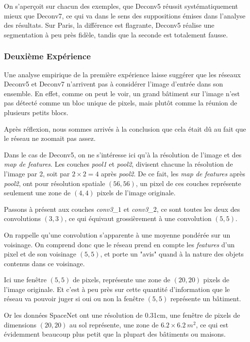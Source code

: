 \documentclass[a4paper, 11pt]{report}
\begin{document}
On s'aperçoit sur chacun des exemples, que Deconv5 réussit systématiquement mieux que Deconv7, ce qui va dans le sens des suppositions émises dans l'analyse des résultats.
Sur Paris, la différence est flagrante, Deconv5 réalise une segmentation à peu près fidèle, tandis que la seconde est totalement fausse.

\subsubsection{Deuxième Expérience}
Une analyse empirique de la première expérience laisse suggérer que les réseaux Deconv5 et Deconv7 n'arrivent pas à considérer l'image d'entrée dans son ensemble.
En effet, comme on peut le voir, un grand bâtiment sur l'image n'est pas détecté comme un bloc unique de pixels, mais plutôt comme la réunion de plusieurs petits blocs.

Après réflexion, nous sommes arrivés à la conclusion que cela était dû au fait que le réseau ne zoomait pas assez.

Dans le cas de Deconv5, on ne s'intéresse ici qu'à la résolution de l'image et des \emph{map de features}.
Les couches \emph{pool1} et \emph{pool2}, divisent chacune la résolution de l'image par 2, soit par $2 \times 2 = 4$ après \emph{pool2}.
De ce fait, les \emph{map de features} après \emph{pool2}, ont pour résolution spatiale $(56, 56)$, un pixel de ces couches représente seulement une zone de $(4, 4)$ pixels de l'image originale.

Passons à présent aux couches \emph{conv3\_$1$} et \emph{conv3\_$2$}, ce sont toutes les deux des convolutions $(3, 3)$, ce qui équivaut grossièrement à une convolution $(5, 5)$.

On rappelle qu'une convolution s'apparente à une moyenne pondérée sur un voisinage. On comprend donc que le réseau prend en compte les \emph{features} d'un pixel et de son voisinage $(5, 5)$, et porte un "avis" quand à la nature des objets contenus dans ce voisinage.

Ici une fenêtre $(5, 5)$ de pixels, représente une zone de $(20, 20)$ pixels de l'image originale. Et c'est à peu près sur cette quantité d'information que le réseau va pouvoir juger si oui ou non la fenêtre $(5, 5)$ représente un bâtiment.

Or les données SpaceNet ont une résolution de 0.31cm, une fenêtre de pixels de dimensions $(20, 20)$ au sol représente, une zone de $6.2 \times 6.2\ m^2$, ce qui est évidemment beaucoup plus petit que la plupart des bâtiments ou maisons.
\end{document}
